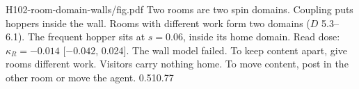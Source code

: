 {H102-room-domain-walls/fig.pdf}
{Two rooms are two spin domains. Coupling puts hoppers inside the wall.}
{Rooms with different work form two domains ($D$ 5.3--6.1). The frequent hopper sits at $s=0.06$, inside its home domain. Read dose: $\kappa_R=-0.014$ [$-0.042$, 0.024]. The wall model failed.}
{To keep content apart, give rooms different work. Visitors carry nothing home. To move content, post in the other room or move the agent.}
{0.51}{0.77}
